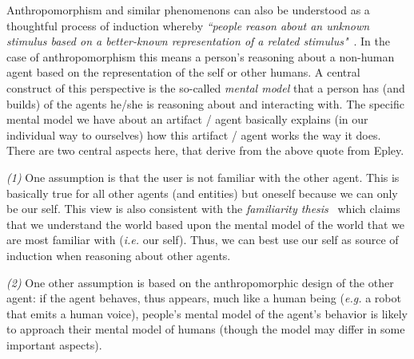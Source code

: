 \documentclass{frontiersSCNS} %
\newcommand{\eg}{\textit{e.g.}\xspace}
\newcommand{\ie}{\textit{i.e.}\xspace}
\begin{document}
Anthropomorphism and similar phenomenons can also be understood as a thoughtful
process of induction whereby \textit{``people reason about an unknown stimulus
based on a better-known representation of a related
stimulus"}~\citep{epley_when_2008}. In the case of anthropomorphism this means a
person's reasoning about a non-human agent based on the representation of the
self or other humans. A central construct of this perspective is the so-called
\textit{mental model} that a person has (and builds) of the agents he/she is
reasoning about and interacting with. The specific mental model we have about an
artifact / agent basically explains (in our individual way to ourselves) how
this artifact / agent works the way it does.  There are two central aspects
here, that derive from the above quote from Epley.

\textit{(1)} One assumption is that the user is not familiar with the other
agent. This is basically true for all other agents (and entities) but oneself
because we can only be our self. This view is also consistent with the
\emph{familiarity thesis}~\citep{hegel_understanding_2008} which claims that we
understand the world based upon the mental model of the world that we are most
familiar with (\ie our self). Thus, we can best use our self as source of induction
when reasoning about other agents.

\textit{(2)} One other assumption is based on the anthropomorphic design of the
other agent: if the agent behaves, thus appears, much like a human being (\eg a
robot that emits a human voice), people's mental model of the agent's behavior
is likely to approach their mental model of humans (though the model may differ
in some important aspects).
\end{document}
